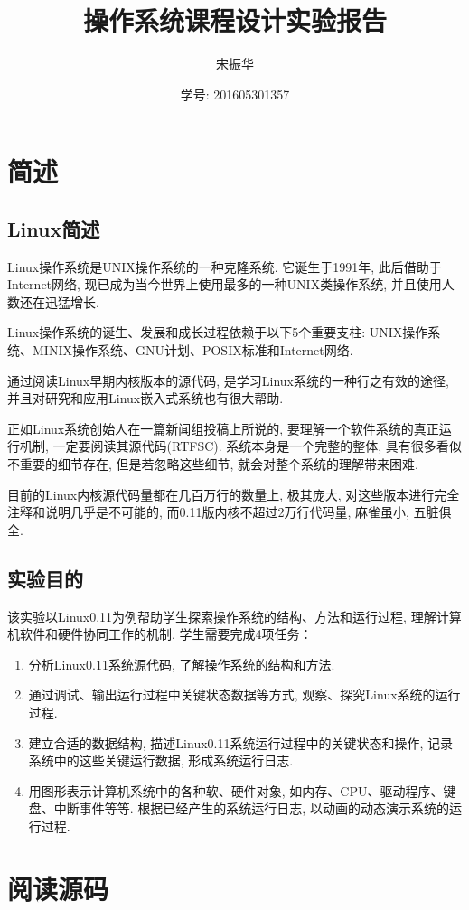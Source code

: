 \documentclass{ctexart}
\title{操作系统课程设计实验报告}
\author{宋振华}
\date{学号: 201605301357}
\begin{document}
\maketitle
\section{简述}

\subsection{Linux简述}
Linux操作系统是UNIX操作系统的一种克隆系统. 它诞生于1991年, 此后借助于Internet网络, 现已成为当今世界上使用最多的一种UNIX类操作系统, 并且使用人数还在迅猛增长.

Linux操作系统的诞生、发展和成长过程依赖于以下5个重要支柱: UNIX操作系统、MINIX操作系统、GNU计划、POSIX标准和Internet网络. 

通过阅读Linux早期内核版本的源代码, 是学习Linux系统的一种行之有效的途径, 并且对研究和应用Linux嵌入式系统也有很大帮助.

正如Linux系统创始人在一篇新闻组投稿上所说的, 要理解一个软件系统的真正运行机制, 一定要阅读其源代码(RTFSC). 系统本身是一个完整的整体, 具有很多看似不重要的细节存在, 但是若忽略这些细节, 就会对整个系统的理解带来困难.

目前的Linux内核源代码量都在几百万行的数量上, 极其庞大, 对这些版本进行完全注释和说明几乎是不可能的, 而0.11版内核不超过2万行代码量, 麻雀虽小, 五脏俱全.

\subsection{实验目的}
该实验以Linux0.11为例帮助学生探索操作系统的结构、方法和运行过程, 理解计算机软件和硬件协同工作的机制. 学生需要完成4项任务：
\begin{enumerate}
	\item 分析Linux0.11系统源代码, 了解操作系统的结构和方法. 
	\item 通过调试、输出运行过程中关键状态数据等方式, 观察、探究Linux系统的运行过程. 
	\item 建立合适的数据结构, 描述Linux0.11系统运行过程中的关键状态和操作, 记录系统中的这些关键运行数据, 形成系统运行日志. 
	\item 用图形表示计算机系统中的各种软、硬件对象, 如内存、CPU、驱动程序、键盘、中断事件等等. 根据已经产生的系统运行日志, 以动画的动态演示系统的运行过程. 
\end{enumerate}

\section{阅读源码}
\end{document}

